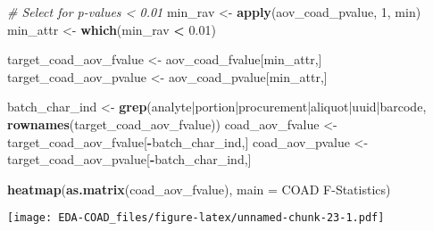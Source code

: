 \documentclass[
]{article}
\newenvironment{Shaded}{\begin{snugshade}}{\end{snugshade}}
\newcommand{\AttributeTok}[1]{\textcolor[rgb]{0.13,0.29,0.53}{#1}}
\newcommand{\CommentTok}[1]{\textcolor[rgb]{0.56,0.35,0.01}{\textit{#1}}}
\newcommand{\DecValTok}[1]{\textcolor[rgb]{0.00,0.00,0.81}{#1}}
\newcommand{\FloatTok}[1]{\textcolor[rgb]{0.00,0.00,0.81}{#1}}
\newcommand{\FunctionTok}[1]{\textcolor[rgb]{0.13,0.29,0.53}{\textbf{#1}}}
\newcommand{\NormalTok}[1]{#1}
\newcommand{\OtherTok}[1]{\textcolor[rgb]{0.56,0.35,0.01}{#1}}
\newcommand{\SpecialCharTok}[1]{\textcolor[rgb]{0.81,0.36,0.00}{\textbf{#1}}}
\newcommand{\StringTok}[1]{\textcolor[rgb]{0.31,0.60,0.02}{#1}}
\begin{document}
\begin{Shaded}
\begin{Highlighting}[]
\CommentTok{\# Select for p{-}values \textless{} 0.01}
\NormalTok{min\_rav }\OtherTok{\textless{}{-}} \FunctionTok{apply}\NormalTok{(aov\_coad\_pvalue, }\DecValTok{1}\NormalTok{, min)}
\NormalTok{min\_attr }\OtherTok{\textless{}{-}} \FunctionTok{which}\NormalTok{(min\_rav }\SpecialCharTok{\textless{}} \FloatTok{0.01}\NormalTok{)}

\NormalTok{target\_coad\_aov\_fvalue }\OtherTok{\textless{}{-}}\NormalTok{ aov\_coad\_fvalue[min\_attr,]}
\NormalTok{target\_coad\_aov\_pvalue }\OtherTok{\textless{}{-}}\NormalTok{ aov\_coad\_pvalue[min\_attr,]}
\end{Highlighting}
\end{Shaded}

\begin{Shaded}
\begin{Highlighting}[]
\NormalTok{batch\_char\_ind }\OtherTok{\textless{}{-}} \FunctionTok{grep}\NormalTok{(}\StringTok{\textquotesingle{}analyte|portion|procurement|aliquot|uuid|barcode\textquotesingle{}}\NormalTok{,}
                       \FunctionTok{rownames}\NormalTok{(target\_coad\_aov\_fvalue))}
\NormalTok{coad\_aov\_fvalue }\OtherTok{\textless{}{-}}\NormalTok{ target\_coad\_aov\_fvalue[}\SpecialCharTok{{-}}\NormalTok{batch\_char\_ind,]}
\NormalTok{coad\_aov\_pvalue }\OtherTok{\textless{}{-}}\NormalTok{ target\_coad\_aov\_pvalue[}\SpecialCharTok{{-}}\NormalTok{batch\_char\_ind,]}
\end{Highlighting}
\end{Shaded}

\begin{Shaded}
\begin{Highlighting}[]
\FunctionTok{heatmap}\NormalTok{(}\FunctionTok{as.matrix}\NormalTok{(coad\_aov\_fvalue), }\AttributeTok{main =} \StringTok{\textquotesingle{}COAD F{-}Statistics\textquotesingle{}}\NormalTok{)}
\end{Highlighting}
\end{Shaded}

\texttt{[image: EDA-COAD\_files/figure-latex/unnamed-chunk-23-1.pdf]}
\end{document}
